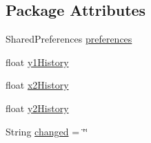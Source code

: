 \subsection*{\-Package \-Attributes}
\begin{DoxyCompactItemize}
\item 
\-Shared\-Preferences \hyperlink{classcom_1_1_cyberpad_1_1_reroot_1_1_pad_activity_a2e6851264cd083738f2acf178c254287}{preferences}
\item 
float \hyperlink{classcom_1_1_cyberpad_1_1_reroot_1_1_pad_activity_a9830f26b98135287325f849e05de999e}{y1\-History}
\item 
float \hyperlink{classcom_1_1_cyberpad_1_1_reroot_1_1_pad_activity_a9f69f416a8a5a645bbb1d309de6ff1d0}{x2\-History}
\item 
float \hyperlink{classcom_1_1_cyberpad_1_1_reroot_1_1_pad_activity_a5248be6ea0b59652f187fd8f76bc2e4c}{y2\-History}
\item 
\-String \hyperlink{classcom_1_1_cyberpad_1_1_reroot_1_1_pad_activity_a465a7a84c8cc731e1a5e128e8b11a482}{changed} = \char`\"{}\char`\"{}
\end{DoxyCompactItemize}
